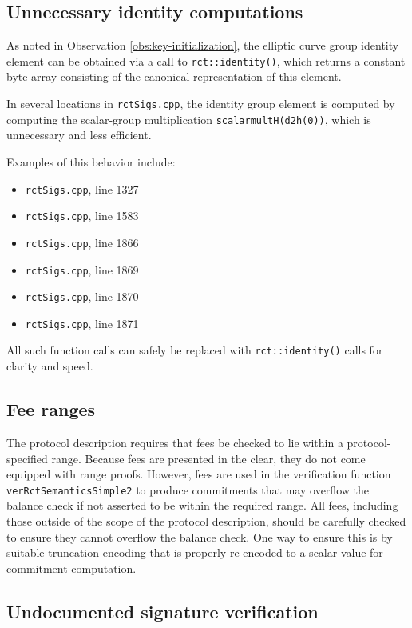 \documentclass{article}
\begin{document}
\subsection{Unnecessary identity computations}

As noted in Observation \ref{obs:key-initialization}, the elliptic curve group identity element can be obtained via a call to \texttt{rct::identity()}, which returns a constant byte array consisting of the canonical representation of this element.

In several locations in \texttt{rctSigs.cpp}, the identity group element is computed by computing the scalar-group multiplication \texttt{scalarmultH(d2h(0))}, which is unnecessary and less efficient.

Examples of this behavior include:
\begin{itemize}
	\item \texttt{rctSigs.cpp}, line 1327
	\item \texttt{rctSigs.cpp}, line 1583
	\item \texttt{rctSigs.cpp}, line 1866
	\item \texttt{rctSigs.cpp}, line 1869
	\item \texttt{rctSigs.cpp}, line 1870
	\item \texttt{rctSigs.cpp}, line 1871
\end{itemize}
All such function calls can safely be replaced with \texttt{rct::identity()} calls for clarity and speed.


\subsection{Fee ranges}

The protocol description requires that fees be checked to lie within a protocol-specified range.
Because fees are presented in the clear, they do not come equipped with range proofs.
However, fees are used in the verification function \texttt{verRctSemanticsSimple2} to produce commitments that may overflow the balance check if not asserted to be within the required range.
All fees, including those outside of the scope of the protocol description, should be carefully checked to ensure they cannot overflow the balance check.
One way to ensure this is by suitable truncation encoding that is properly re-encoded to a scalar value for commitment computation.


\subsection{Undocumented signature verification}
\end{document}
